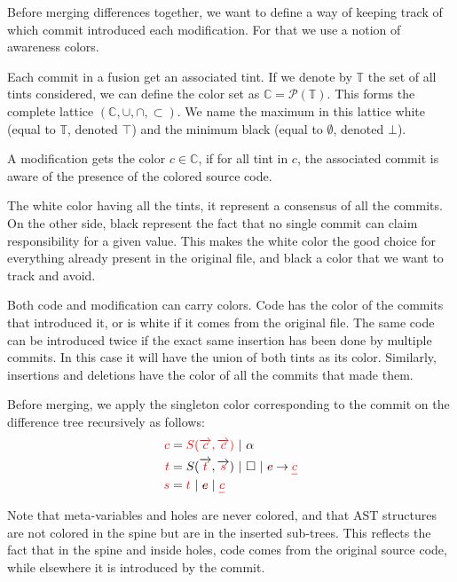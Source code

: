 \documentclass[a4paper,10pt]{article}
\newcommand{\typsep}{\ |\ }
\begin{document}
Before merging differences together, we want to define a way of keeping track of which commit introduced each modification. For that we use a notion of awareness colors.

Each commit in a fusion get an associated tint. If we denote by $\mathbb{T}$ the set of all tints considered, we can define the color set as $\mathbb{C} = \mathcal{P}(\mathbb{T})$. This forms the complete lattice $(\mathbb{C}, \cup, \cap, \subset)$. We name the maximum in this lattice white (equal to $\mathbb{T}$, denoted $\top$) and the minimum black (equal to $\emptyset$, denoted $\bot$).

A modification gets the color $c \in \mathbb{C}$, if for all tint in $c$, the associated commit is aware of the presence of the colored source code.

The white color having all the tints, it represent a consensus of all the commits. On the other side, black represent the fact that no single commit can claim responsibility for a given value. This makes the white color the good choice for everything already present in the original file, and black a color that we want to track and avoid.

Both code and modification can carry colors. Code has the color of the commits that introduced it, or is white if it comes from the original file. The same code can be introduced twice if the exact same insertion has been done by multiple commits. In this case it will have the union of both tints as its color. Similarly, insertions and deletions have the color of all the commits that made them.

Before merging, we apply the singleton color corresponding to the commit on the difference tree recursively as follows:
\begin{align*}
{\color{red}c} &= {\color{red}S(\overrightarrow{c}, \overrightarrow{c})} \typsep \alpha\\
{\color{red}t} &= S(\overrightarrow{\color{red}t}, \overrightarrow{\color{red}s}) \typsep \square \typsep \text{\setstcolor{red}\st{$c$}} \rightarrow \text{\color{red}\ul{$c$}}\\
{\color{red}s} &= {\color{red}t} \typsep \text{\setstcolor{red}\st{$c$}} \typsep \text{\color{red}\ul{$c$}}\\
\end{align*}

Note that meta-variables and holes are never colored, and that AST structures are not colored in the spine but are in the inserted sub-trees. This reflects the fact that in the spine and inside holes, code comes from the original source code, while elsewhere it is introduced by the commit.
\end{document}

